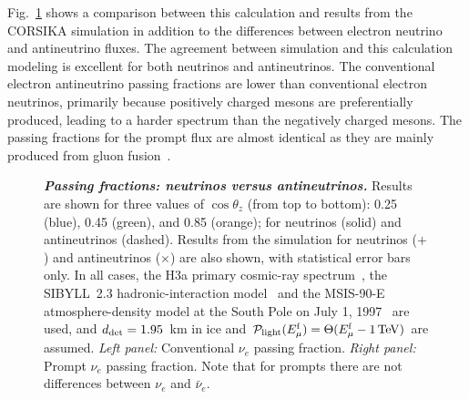 Fig.~\ref{fig:nu-e-neutrino-vs-antineutrino} shows a comparison between this calculation and results from the CORSIKA simulation in addition to the differences between electron neutrino and antineutrino fluxes.
The agreement between simulation and this calculation modeling is excellent for
both neutrinos and antineutrinos.
The conventional electron antineutrino passing fractions are lower than conventional electron neutrinos, primarily because positively charged mesons are preferentially produced, leading to a harder spectrum than the negatively charged mesons.
The passing fractions for the prompt flux are almost identical as they are mainly produced from gluon fusion~\cite{Arguelles:2015wba}.

\begin{figure}
	\centering
	\caption{\textbf{\textit{Passing fractions: neutrinos versus antineutrinos.}} Results are shown for three values of $\cos\theta_z$ (from top to bottom): 0.25 (blue), 0.45 (green), and 0.85 (orange); for neutrinos (solid) and antineutrinos (dashed). Results from the \CORSIKA{} simulation for neutrinos ($+$) and antineutrinos ($\times$) are also shown, with statistical error bars only. In all cases, the H3a primary cosmic-ray spectrum~\cite{Gaisser:2011cc}, the SIBYLL~2.3 hadronic-interaction model~\cite{Engel:2015dxa, Riehn:2015oba} and the MSIS-90-E atmosphere-density model at the South Pole on July 1, 1997~\cite{Labitzke:1985, Hedin:1991} are used, and $d_{\rm det} = 1.95$~km in ice and ${\mathcal P}_{\rm light}(E_{\mu}^{\rm f}) = \Theta(E_{\mu}^{\rm f} - 1\,{\rm TeV})$ are assumed. \textit{Left panel:} Conventional $\nu_e$ passing fraction. \textit{Right panel:} Prompt $\nu_e$ passing fraction. Note that for prompts there are not differences between $\nu_e$ and $\bar\nu_e$.
	}
	\label{fig:nu-e-neutrino-vs-antineutrino}
\end{figure}

